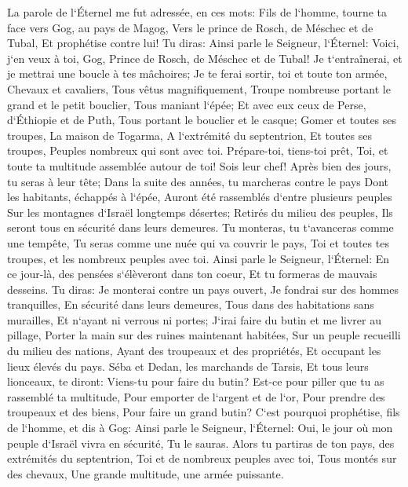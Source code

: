 \verse La parole de l`Éternel me fut adressée, en ces mots: 
\verse Fils de l`homme, tourne ta face vers Gog, au pays de Magog, Vers le prince de Rosch, de Méschec et de Tubal, Et prophétise contre lui! 
\verse Tu diras: Ainsi parle le Seigneur, l`Éternel: Voici, j`en veux à toi, Gog, Prince de Rosch, de Méschec et de Tubal! 
\verse Je t`entraînerai, et je mettrai une boucle à tes mâchoires; Je te ferai sortir, toi et toute ton armée, Chevaux et cavaliers, Tous vêtus magnifiquement, Troupe nombreuse portant le grand et le petit bouclier, Tous maniant l`épée; 
\verse Et avec eux ceux de Perse, d`Éthiopie et de Puth, Tous portant le bouclier et le casque; 
\verse Gomer et toutes ses troupes, La maison de Togarma, A l`extrémité du septentrion, Et toutes ses troupes, Peuples nombreux qui sont avec toi. 
\verse Prépare-toi, tiens-toi prêt, Toi, et toute ta multitude assemblée autour de toi! Sois leur chef! 
\verse Après bien des jours, tu seras à leur tête; Dans la suite des années, tu marcheras contre le pays Dont les habitants, échappés à l`épée, Auront été rassemblés d`entre plusieurs peuples Sur les montagnes d`Israël longtemps désertes; Retirés du milieu des peuples, Ils seront tous en sécurité dans leurs demeures. 
\verse Tu monteras, tu t`avanceras comme une tempête, Tu seras comme une nuée qui va couvrir le pays, Toi et toutes tes troupes, et les nombreux peuples avec toi. 
\verse Ainsi parle le Seigneur, l`Éternel: En ce jour-là, des pensées s`élèveront dans ton coeur, Et tu formeras de mauvais desseins. 
\verse Tu diras: Je monterai contre un pays ouvert, Je fondrai sur des hommes tranquilles, En sécurité dans leurs demeures, Tous dans des habitations sans murailles, Et n`ayant ni verrous ni portes; 
\verse J`irai faire du butin et me livrer au pillage, Porter la main sur des ruines maintenant habitées, Sur un peuple recueilli du milieu des nations, Ayant des troupeaux et des propriétés, Et occupant les lieux élevés du pays. 
\verse Séba et Dedan, les marchands de Tarsis, Et tous leurs lionceaux, te diront: Viens-tu pour faire du butin? Est-ce pour piller que tu as rassemblé ta multitude, Pour emporter de l`argent et de l`or, Pour prendre des troupeaux et des biens, Pour faire un grand butin? 
\verse C`est pourquoi prophétise, fils de l`homme, et dis à Gog: Ainsi parle le Seigneur, l`Éternel: Oui, le jour où mon peuple d`Israël vivra en sécurité, Tu le sauras. 
\verse Alors tu partiras de ton pays, des extrémités du septentrion, Toi et de nombreux peuples avec toi, Tous montés sur des chevaux, Une grande multitude, une armée puissante. 
